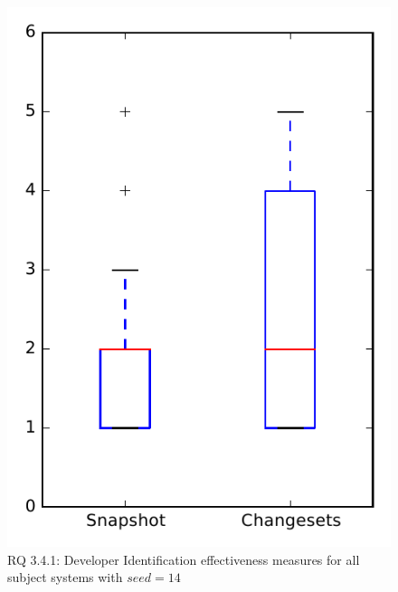 
\begin{figure}
\centering
\includegraphics[height=0.4\textheight]{figures/dit_seed/rq1_overview_14}
\caption{RQ 3.4.1: Developer Identification effectiveness measures for all subject systems with $seed=14$}
\label{fig:dit_seed:rq1:overview}
\end{figure}
